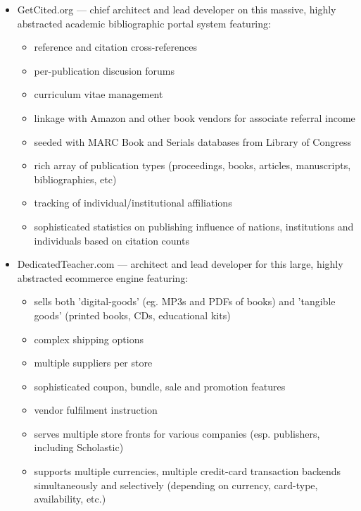 \begin{resume}
\begin{position}
\begin{itemize}
\item GetCited.org --- chief architect and lead developer on
  this massive, highly abstracted academic bibliographic portal system featuring:
  \begin{itemize}
    \item reference and citation cross-references
    \item per-publication discusion forums
    \item curriculum vitae management
    \item linkage with Amazon and other book vendors for associate
    referral income
    \item seeded with MARC Book and Serials databases from Library of Congress
    \item rich array of publication types (proceedings, books, articles,
       manuscripts, bibliographies, etc)
    \item tracking of individual/institutional affiliations
    \item sophisticated statistics on publishing influence of
       nations, institutions and individuals based on citation counts
  \end{itemize}    

\item DedicatedTeacher.com --- architect and lead developer
  for this large, highly abstracted ecommerce engine featuring:
    \begin{itemize}
      \item sells both 'digital-goods' (eg. MP3s and PDFs of books)
      and 'tangible goods' (printed books, CDs, educational kits)
      \item complex shipping options
      \item multiple suppliers per store
      \item sophisticated coupon, bundle, sale and promotion features
      \item vendor fulfilment instruction
      \item serves multiple store fronts for various companies
      (esp. publishers, including Scholastic)
      \item supports multiple currencies, multiple credit-card
      transaction backends simultaneously and selectively 
      (depending on currency, card-type, availability, etc.)
    \end{itemize}


\end{itemize}
\end{position}
\end{resume}
